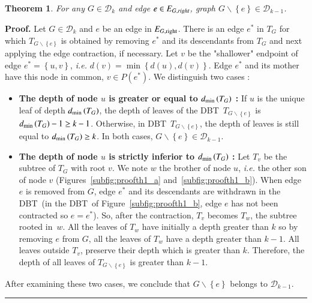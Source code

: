 \documentclass[preprint]{elsarticle}
\newtheorem{theorem}{Theorem}
\newenvironment{proof}[1][Proof]{\textbf{#1.} }{\ \rule{0.5em}{0.5em}}
\newcommand{\set}[1]{\left\{ #1 \right\}}
\newcommand{\mcald}{\mathcal{D}}
\newcommand{\ebt}{DBT}
\newcommand{\dmin}{d_{\mbox{\scriptsize{min}}}}
\newcommand{\eright}[1]{E_{#1, \mbox{\scriptsize{right}}}}
\begin{document}
\begin{theorem}
For any $G \in \mcald_k$ and edge $e \in E_{G, \emph{right}}$, graph $G \backslash \set{e} \in \mcald_{k-1}$.
\label{th:completebinary}
\end{theorem}
\begin{proof}
Let $G \in \mcald_k$ and $e$ be an edge in $\eright{G}$. There is an edge $e^*$ in $T_G$ for which $T_{G \backslash \set{e}}$ is obtained by removing $e^*$ and its descendants from $T_G$ and next applying the edge contraction, if necessary. Let $v$ be the "shallower" endpoint of edge $e^* = \set{u,v}$, {\em i.e.} $d(v) = \min \set{d(u),d(v)}$. Edge $e^*$ and its mother have this node in common, $v \in P\left(e^*\right)$. We distinguish two cases :
\begin{itemize}[leftmargin=0.3cm]
\item {\bf The depth of node $u$ is greater or equal to $\dmin\left(T_G\right)$ :} If $u$ is the unique leaf of depth $\dmin\left(T_G\right)$, the depth of leaves of the \ebt ~$T_{G\backslash \set{e}}$ is $\dmin\left(T_G\right) - 1 \geq k-1$. Otherwise, in \ebt ~$T_{G\backslash \set{e}}$, the depth of leaves is still equal to $\dmin\left(T_G\right) \geq k$. In both cases, $G\backslash \set{e} \in \mcald_{k-1}$.
\item {\bf The depth of node $u$ is strictly inferior to $\dmin\left(T_G\right)$ :} Let $T_v$ be the subtree of $T_G$ with root $v$. We note $w$ the brother of node $u$, {\em i.e.} the other son of node $v$ (Figures~\ref{subfig:proofth1_a} and~\ref{subfig:proofth1_b}). 
When edge $e$ is removed from $G$, edge $e^*$ and its descendants are withdrawn in the \ebt ~(in the \ebt ~of Figure~\ref{subfig:proofth1_b}, edge $e$ has not been contracted so $e = e^*$). So, after the contraction, $T_v$ becomes $T_w$, the subtree rooted in~$w$. All the leaves of $T_w$ have initially a depth greater than $k$ so by removing $e$ from $G$, all the leaves of $T_w$ have a depth greater than $k-1$. All leaves outside $T_v$, preserve their depth which is greater than $k$. Therefore, the depth of all leaves of $T_{G \backslash \set{e}}$ is greater than $k-1$.
\end{itemize}
After examining these two cases, we conclude that $G\backslash \set{e}$ belongs to  
$\mcald_{k-1}$.
\end{proof}
\end{document}
